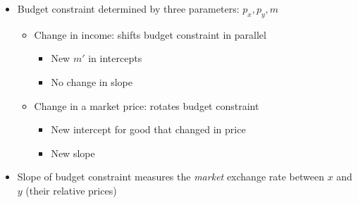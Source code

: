 \documentclass{article}
\begin{document}
\begin{itemize}
	\item Budget constraint determined by three parameters: $p_x, p_y, m$
	\begin{itemize}
		\item Change in income: shifts budget constraint in parallel 
		\begin{itemize}
			\item New $m'$ in intercepts 
			\item No change in slope 
		\end{itemize}
		\item Change in a market price: rotates budget constraint 
		\begin{itemize}
			\item New intercept for good that changed in price
			\item New slope 
		\end{itemize}
	\end{itemize} 
	\item Slope of budget constraint measures the \emph{market} exchange rate between $x$ and $y$ (their relative prices)
\end{itemize}
\end{document}
